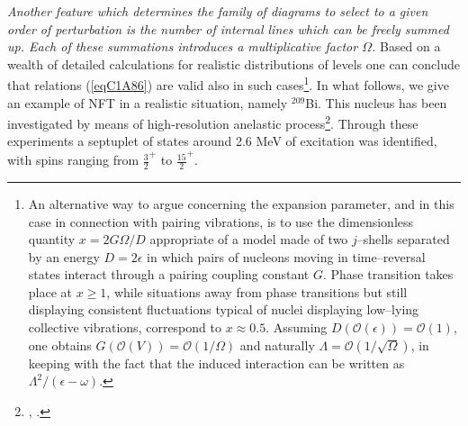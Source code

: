 \textit{Another feature which determines the family of diagrams to select to a given order of perturbation is the number of internal lines which can be freely summed up. Each of these summations introduces a multiplicative factor $\Omega$.} Based on a wealth of detailed calculations for realistic distributions of levels one can conclude that  relations (\ref{eqC1A86}) are valid also in such cases\footnote{An alternative way to argue concerning the expansion parameter, and in this case in connection with pairing vibrations, is to use the dimensionless quantity $x=2G\Omega/D$ appropriate of a model made of two $j$--shells separated by an energy $D=2\epsilon$ in which pairs of nucleons moving in time--reversal states interact through a pairing coupling constant $G$. Phase transition takes place at $x\geq1$, while situations away from phase transitions but still displaying consistent fluctuations typical of nuclei displaying low--lying collective vibrations, correspond to $x\approx0.5$. Assuming $D(\mathcal O(\epsilon))=\mathcal O(1)$, one obtains $G(\mathcal O(V))=\mathcal O(1/\Omega)$ and naturally $\Lambda=\mathcal O(1/\sqrt{\Omega})$, in keeping with the fact that the induced interaction can be written as $\Lambda^2/(\epsilon-\omega)$.}.  In what follows, we give an example of NFT in a realistic situation, namely $^{209}$Bi. 
This nucleus has been investigated by means of high-resolution anelastic process\footnote{\cite{Ungrin:71}, \cite{Broglia:70}.}. Through these experiments a septuplet of states around 2.6 MeV of excitation was identified, with spins 
ranging from $\frac{3}{2}^+$ to $\frac{15}{2}^+$. 


